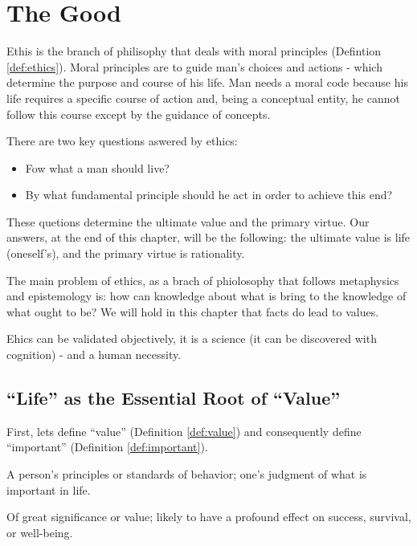 \chapter{The Good}

    Ethis is the branch of philisophy that deals with moral principles (Defintion \ref{def:ethics}). Moral principles are to guide man's choices and actions - which determine the purpose and course of his life. Man needs a moral code because his life requires a specific course of action and, being a conceptual entity, he cannot follow this course except by the guidance of concepts.

    There are two key questions aswered by ethics:
    \begin{itemize}
        \item Fow what a man should live?
        \item By what fundamental principle should he act in order to achieve this end?
    \end{itemize}

    These quetions determine the ultimate value and the primary virtue. Our answers, at the end of this chapter, will be the following: the ultimate value is life (oneself's), and the primary virtue is rationality.

    The main problem of ethics, as a brach of phiolosophy that follows metaphysics and epistemology is: how can knowledge about what is bring to the knowledge of what ought to be? We will hold in this chapter that facts do lead to values.
    
    Ehics can be validated objectively, it is a science (it can be discovered with cognition) - and a human necessity.

    \section{``Life'' as the Essential Root of ``Value''}

        First, lets define ``value'' (Definition \ref{def:value}) and consequently define ``important'' (Definition \ref{def:important}).

            \begin{definition}[Value]
            \label{def:value}
                A person's principles or standards of behavior; one's judgment of what is important in life.   
            \end{definition}

            \begin{definition}[Important]
            \label{def:important}
                Of great significance or value; likely to have a profound effect on success, survival, or well-being.
            \end{definition}

